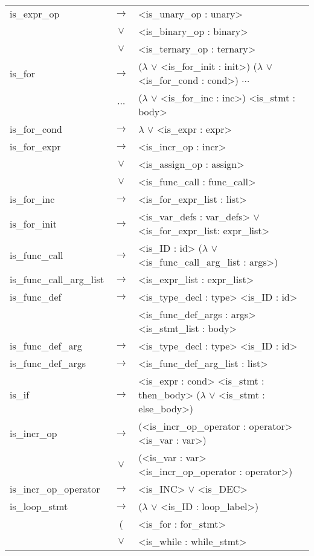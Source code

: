 \documentclass[a4paper]{article}
\begin{document}
\begin{longtable}{lcl}
	is\_expr\_op				& $\to$ & <is\_unary\_op : unary> \\
								& $\vee$ & <is\_binary\_op : binary>\\
								& $\vee$ & <is\_ternary\_op : ternary>\\
	is\_for						& $\to$ & ($\lambda$ $\vee$ <is\_for\_init : init>) ($\lambda$ $\vee$ <is\_for\_cond : cond>) $\cdots$ \\
								& $\cdots$ & ($\lambda$ $\vee$ <is\_for\_inc : inc>) <is\_stmt : body> \\
	is\_for\_cond				& $\to$ & $\lambda$ $\vee$ <is\_expr : expr> \\	
	is\_for\_expr				& $\to$ & <is\_incr\_op : incr> \\
								& $\vee$ & <is\_assign\_op : assign> \\
								& $\vee$ & <is\_func\_call : func\_call> \\
	is\_for\_inc				& $\to$ & <is\_for\_expr\_list : list> \\ 	
	is\_for\_init				& $\to$ & <is\_var\_defs : var\_defs> $\vee$ <is\_for\_expr\_list: expr\_list> \\
	is\_func\_call				& $\to$ & <is\_ID : id> ($\lambda$ $\vee$ <is\_func\_call\_arg\_list : args>) \\
	is\_func\_call\_arg\_list	& $\to$ & <is\_expr\_list : expr\_list> \\	
	is\_func\_def				& $\to$ & <is\_type\_decl : type> <is\_ID : id> \\
								&       & <is\_func\_def\_args : args> <is\_stmt\_list : body> \\
	is\_func\_def\_arg			& $\to$ & <is\_type\_decl : type> <is\_ID : id> \\
	is\_func\_def\_args			& $\to$ & <is\_func\_def\_arg\_list : list> \\		
	is\_if						& $\to$ & <is\_expr : cond> <is\_stmt : then\_body> ($\lambda$ $\vee$ <is\_stmt : else\_body>) \\
	is\_incr\_op				& $\to$ &(<is\_incr\_op\_operator : operator> <is\_var : var>) \\
								& $\vee$ & (<is\_var : var> <is\_incr\_op\_operator : operator>) \\
	is\_incr\_op\_operator		& $\to$ & <is\_INC> $\vee$ <is\_DEC> \\
	is\_loop\_stmt				& $\to$ & ($\lambda$ $\vee$ <is\_ID : loop\_label>)\\
								& ( & <is\_for : for\_stmt> \\
								& $\vee$ & <is\_while : while\_stmt> \\ 

\end{longtable}
\end{document}
